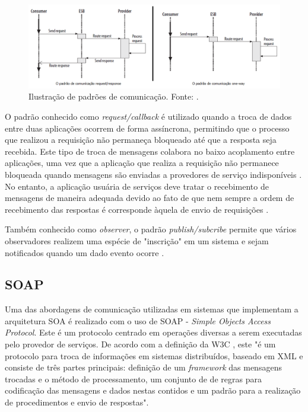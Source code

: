 \begin{figure}[htb]
\centering
\includegraphics[scale=0.5]{figuras/padroes_comunicacao.png}
\caption{Ilustração de padrões de comunicação. Fonte: \cite{josuttis_soa_2007}.}
\label{padroes_comunicacao}
\end{figure}

O padrão conhecido como \textit{request/callback} é utilizado quando a troca de dados entre duas aplicações ocorrem de forma assíncrona, permitindo que o processo que realizou a requisição não permaneça bloqueado até que a resposta seja recebida. Este tipo de troca de mensagens colabora no baixo acoplamento entre aplicações, uma vez que a aplicação que realiza a requisição não permanece bloqueada quando mensagens são enviadas a provedores de serviço indisponíveis \cite{josuttis_soa_2007}. No entanto, a aplicação usuária de serviços deve tratar o recebimento de mensagens de maneira adequada devido ao fato de que nem sempre a ordem de recebimento das respostas é corresponde àquela de envio de requisições \cite{josuttis_soa_2007}.

Também conhecido como \textit{observer}, o padrão \textit{publish/subcribe} permite que vários observadores realizem uma espécie de "inscrição" em um sistema e sejam notificados quando um dado evento ocorre \cite{josuttis_soa_2007}.

\subsection{SOAP}
Uma das abordagens de comunicação utilizadas em sistemas que implementam a arquitetura SOA é realizado com o uso de SOAP - \textit{Simple Objects Access Protocol}. Este é um protocolo centrado em operações diversas a serem executadas pelo provedor de serviços. De acordo com a definição da W3C \cite{box_simple_2000}, este "é um protocolo para troca de informações em sistemas distribuídos, baseado em XML e consiste de três partes principais: definição de um \textit{framework} das mensagens trocadas e o método de processamento, um conjunto de de regras para codificação das mensagens e dados nestas contidos e um padrão para a realização de procedimentos e envio de respostas".

